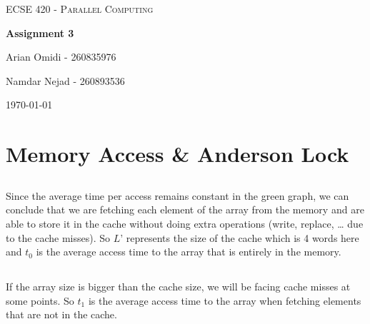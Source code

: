 \documentclass{article}%
\begin{document}

\begin{titlepage}
    \centering
	{\scshape\Large ECSE 420 - Parallel Computing \par}
	\vspace{5mm}
	{\huge\bfseries Assignment 3 \par}
	

	\vfill
	
	{\large Arian Omidi - 260835976\par}
	{\large{Namdar Nejad - 260893536}\par}
	\vspace{10mm}
	{\large \today\par}
	
	\vfill
\end{titlepage}

\setcounter{page}{1} %


\section{Memory Access \& Anderson Lock}
    \subsection{}
        Since the average time per access remains constant in the green graph, we can conclude that we are fetching each element of the array from the memory and are able to store it in the cache without doing extra operations (write, replace, … due to the cache misses). So $L’$ represents the size of the cache which is 4 words here and $t_0$ is the average access time to the array that is entirely in the memory.
    
    \subsection{}
        If the array size is bigger than the cache size, we will be facing cache misses at some points. So $t_1$ is the average access time to the array when fetching elements that are not in the cache.
\end{document}
